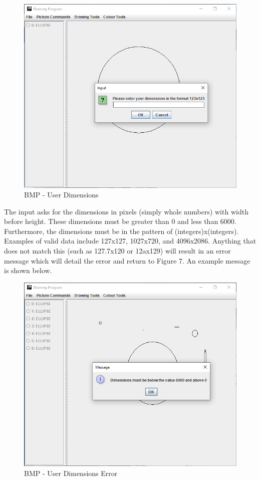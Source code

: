 \documentclass[12pt]{article} %
\begin{document}
\begin{figure}[H]
\caption{BMP - User Dimensions}
\centering
\includegraphics[scale=0.75]{pictures/bmpSecondWindow.PNG}
\end{figure}


The input asks for the dimensions in pixels (simply whole numbers) with width before height. These dimensions must be greater than 0 and less than 6000. Furthermore, the dimensions must be in the pattern of (integers)x(integers). Examples of valid data include 127x127, 1027x720, and 4096x2086. Anything that does not match this (such as 127.7x120 or 12ax129) will result in an error message which will detail the error and return to Figure 7. An example message is shown below.

\begin{figure}[H]
\caption{BMP - User Dimensions Error}
\centering
\includegraphics[scale=0.75]{pictures/bmpThirdWindow.PNG}
\end{figure}
\end{document}
